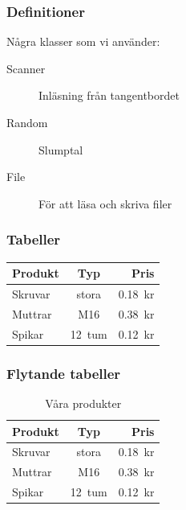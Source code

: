 \begin{frame}[fragile,t]
  \frametitle{Definitioner}
  \vspace{2em}


  \begin{exlatex}
Några klasser som vi använder:

\begin{description}
  \item[Scanner] Inläsning från tangentbordet
  \item[Random] Slumptal
  \item[File] För att läsa och skriva filer
\end{description}
  \end{exlatex}

\end{frame}

\begin{frame}[fragile,t]
  \frametitle{Tabeller}
  \vspace{2em}
  
  \begin{itemize}
  \end{itemize}

  \begin{exlatex}
\begin{tabular}{lcr}
  Produkt & Typ    & Pris    \\
  \hline
  Skruvar & stora  & 0.18~kr \\
  Muttrar & M16    & 0.38~kr \\
  Spikar  & 12~tum & 0.12~kr
\end{tabular}
  \end{exlatex}

\end{frame}

\begin{frame}[fragile,t]
  \frametitle{Flytande tabeller}



  \begin{exlatex}
\begin{table}[t]
  \begin{tabular}{|l|c|r|}
    Produkt & Typ    & Pris    \\
    \hline
    Skruvar & stora  & 0.18~kr \\
    Muttrar & M16    & 0.38~kr \\
    Spikar  & 12~tum & 0.12~kr
  \end{tabular}
  \caption{Våra produkter}
\end{table}
  \end{exlatex}
\end{frame}

